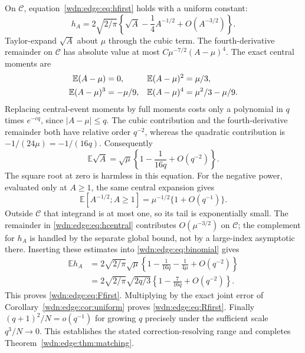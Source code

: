 \documentclass[11pt,letterpaper]{article}
\theoremstyle{remark}\newtheorem{remark}[theorem]{Remark}
\newcommand{\E}{\mathbb E}
\begin{document}
On $\mathcal C$, equation~\eqref{wdn:edge:eq:hfirst} holds with a uniform constant:
\begin{equation}\label{wdn:edge:eq:hcentral}
 h_A=2\sqrt{2/\pi}\left\{\sqrt A-\frac14 A^{-1/2}
                              +O(A^{-3/2})\right\}.
\end{equation}
Taylor-expand $\sqrt A$ about $\mu$ through the cubic term.
The fourth-derivative remainder on $\mathcal C$ has absolute value at most
$C\mu^{-7/2}(A-\mu)^4$. The exact central moments are
\begin{align}\label{wdn:edge:eq:moments}
 \E(A-\mu)&=0,&\E(A-\mu)^2&=\mu/3,\notag\\
 \E(A-\mu)^3&=-\mu/9,&
 \E(A-\mu)^4&=\mu^2/3-\mu/9.
\end{align}
Replacing central-event moments by full moments costs only a polynomial
in $q$ times $e^{-cq}$, since $|A-\mu|\le q$.
The cubic contribution and the fourth-derivative remainder both have
relative order $q^{-2}$, whereas the quadratic contribution is
$-1/(24\mu)=-1/(16q)$. Consequently
\begin{equation}\label{wdn:edge:eq:sqrtmean}
 \E\sqrt A=\sqrt\mu\left\{1-\frac1{16q}+O(q^{-2})\right\}.
\end{equation}
The square root at zero is harmless in this equation.
For the negative power, evaluated only at $A\ge1$, the same central
expansion gives
\begin{equation}\label{wdn:edge:eq:invrootmean}
 \E[A^{-1/2};A\ge1]=\mu^{-1/2}\{1+O(q^{-1})\}.
\end{equation}
Outside $\mathcal C$ that integrand is at most one, so its tail is
exponentially small. The remainder in \eqref{wdn:edge:eq:hcentral} contributes
$O(\mu^{-3/2})$ on $\mathcal C$; the complement for $h_A$ is handled
by the separate global bound, not by a large-index asymptotic there.
Inserting these estimates into \eqref{wdn:edge:eq:binomial} gives
\begin{align*}
 \E h_A
 &=2\sqrt{2/\pi}\sqrt\mu
     \left\{1-\frac1{16q}-\frac1{4\mu}+O(q^{-2})\right\}\\
 &=2\sqrt{2/\pi}\sqrt{2q/3}
     \left\{1-\frac7{16q}+O(q^{-2})\right\}.
\end{align*}
This proves \eqref{wdn:edge:eq:Ffirst}. Multiplying by the exact joint error
of Corollary~\ref{wdn:edge:cor:uniform} proves \eqref{wdn:edge:eq:Rfirst}.
Finally $(q+1)^2/N=o(q^{-1})$ for growing $q$ precisely under the
sufficient scale $q^3/N\to0$. This establishes the stated
correction-resolving range and completes Theorem~\ref{wdn:edge:thm:matching}.
\end{document}
